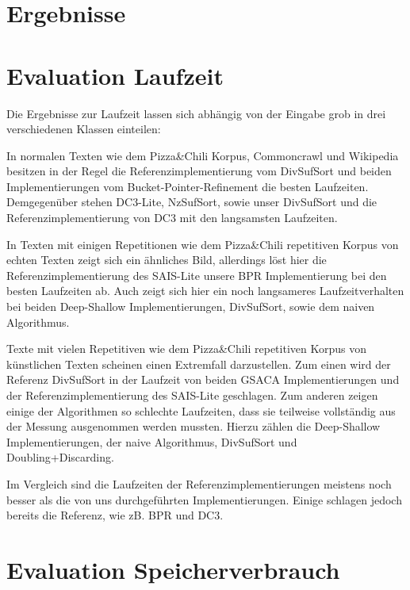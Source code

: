 \section{Ergebnisse}




\section{Evaluation Laufzeit}

Die Ergebnisse zur Laufzeit lassen sich abhängig von der Eingabe grob in drei verschiedenen Klassen einteilen:

In normalen Texten wie dem Pizza\&Chili Korpus, Commoncrawl und Wikipedia besitzen in der Regel die Referenzimplementierung vom DivSufSort und beiden Implementierungen vom Bucket-Pointer-Refinement die besten Laufzeiten. Demgegenüber stehen DC3-Lite, NzSufSort, sowie unser DivSufSort und die Referenzimplementierung von DC3 mit den langsamsten Laufzeiten.

In Texten mit einigen Repetitionen wie dem  Pizza\&Chili repetitiven Korpus von echten Texten zeigt sich ein ähnliches Bild, allerdings löst hier die Referenzimplementierung des SAIS-Lite unsere BPR Implementierung bei den besten Laufzeiten ab. Auch zeigt sich hier ein noch langsameres Laufzeitverhalten bei beiden Deep-Shallow Implementierungen, DivSufSort, sowie dem naiven Algorithmus.

Texte mit vielen Repetitiven wie dem Pizza\&Chili repetitiven Korpus von künstlichen Texten scheinen einen Extremfall darzustellen. Zum einen wird der Referenz DivSufSort in der Laufzeit von beiden GSACA Implementierungen und der Referenzimplementierung des SAIS-Lite geschlagen. Zum anderen zeigen einige der Algorithmen so schlechte Laufzeiten, dass sie teilweise vollständig aus der Messung ausgenommen werden mussten. Hierzu zählen die Deep-Shallow Implementierungen, der naive Algorithmus, DivSufSort und Doubling+Discarding.

Im Vergleich sind die Laufzeiten der Referenzimplementierungen meistens noch besser als die von uns durchgeführten Implementierungen. Einige schlagen jedoch bereits die Referenz, wie zB. BPR und DC3.

\section{Evaluation Speicherverbrauch}

